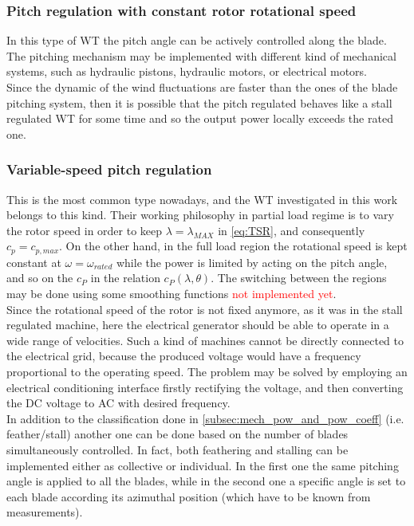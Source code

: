 \subsubsection{Pitch regulation with constant rotor rotational speed}
In this type of \acrshort{WT} the pitch angle can be actively controlled along the blade. The pitching mechanism may be implemented with different kind of mechanical systems, such as hydraulic pistons, hydraulic motors, or electrical motors. \\
Since the dynamic of the wind fluctuations are faster than the ones of the blade pitching system, then it is possible that the pitch regulated behaves like a stall regulated \acrshort{WT} for some time and so the output power locally exceeds the rated one.

\subsubsection{Variable-speed pitch regulation}
This is the most common type nowadays, and the \acrshort{WT} investigated in this work belongs to this kind. Their working philosophy in partial load regime is to vary the rotor speed in order to keep $\lambda = \lambda_{MAX}$ in \autoref{eq:TSR}, and consequently $c_p=c_{p,max}$. On the other hand, in the full load region the rotational speed is kept constant at $\omega = \omega_{rated}$ while the power is limited by acting on the pitch angle, and so on the $c_P$ in the relation $c_P(\lambda, \theta)$. The switching between the regions may be done using some smoothing functions \textcolor{red}{not implemented yet}. \\
Since the rotational speed of the rotor is not fixed anymore, as it was in the stall regulated machine, here the electrical generator should be able to operate in a wide range of velocities. Such a kind of machines cannot be directly connected to the electrical grid, because the produced voltage would have a frequency proportional to the operating speed. The problem may be solved by employing an electrical conditioning interface firstly rectifying the voltage, and then converting the DC voltage to AC with desired frequency. \\
In addition to the classification done in \autoref{subsec:mech_pow_and_pow_coeff} (i.e. feather/stall) another one can be done based on the number of blades simultaneously controlled. In fact, both feathering and stalling can be implemented either as collective or individual. In the first one the same pitching angle is applied to all the blades, while in the second one a specific angle is set to each blade according its azimuthal position (which have to be known from measurements).

